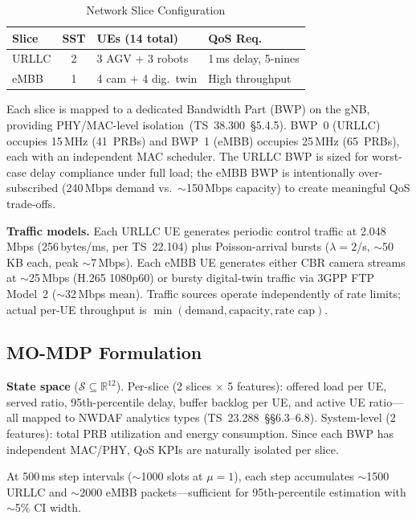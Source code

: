 \documentclass[conference]{IEEEtran}
\newcommand{\Real}{\mathbb{R}}
\begin{document}
\begin{table}[t]
\centering
\caption{Network Slice Configuration}
\label{tab:slices}
\footnotesize
\setlength{\tabcolsep}{2.5pt}
\begin{tabular}{@{}lclp{1.9cm}@{}}
\toprule
\textbf{Slice} & \textbf{SST} & \textbf{UEs (14 total)} & \textbf{QoS Req.} \\
\midrule
URLLC & 2 & 3 AGV + 3 robots & 1\,ms delay, 5-nines \\
eMBB & 1 & 4 cam + 4 dig.\ twin & High throughput \\
\bottomrule
\end{tabular}
\end{table}

Each slice is mapped to a dedicated Bandwidth Part (BWP) on the gNB, providing PHY/MAC-level isolation~(TS~38.300~\S5.4.5).
BWP~0 (URLLC) occupies 15\,MHz (41~PRBs) and BWP~1 (eMBB) occupies 25\,MHz (65~PRBs), each with an independent MAC scheduler.
The URLLC BWP is sized for worst-case delay compliance under full load; the eMBB BWP is intentionally over-subscribed (240\,Mbps demand vs.\ $\sim$150\,Mbps capacity) to create meaningful QoS trade-offs.

\textbf{Traffic models.}
Each URLLC UE generates periodic control traffic at 2.048\,Mbps (256\,bytes/ms, per TS~22.104) plus Poisson-arrival bursts ($\lambda{=}2$/s, $\sim$50\,KB each, peak $\sim$7\,Mbps).
Each eMBB UE generates either CBR camera streams at $\sim$25\,Mbps (H.265 1080p60) or bursty digital-twin traffic via 3GPP FTP Model~2 ($\sim$32\,Mbps mean).
Traffic sources operate independently of rate limits; actual per-UE throughput is $\min(\text{demand}, \text{capacity}, \text{rate cap})$.

\subsection{MO-MDP Formulation}\label{sec:mdp}

\textbf{State space} ($\mathcal{S} \subseteq \Real^{12}$).
Per-slice (2 slices $\times$ 5 features): offered load per UE, served ratio, 95th-percentile delay, buffer backlog per UE, and active UE ratio---all mapped to NWDAF analytics types (TS~23.288~\S\S6.3--6.8).
System-level (2 features): total PRB utilization and energy consumption.
Since each BWP has independent MAC/PHY, QoS KPIs are naturally isolated per slice.

At 500\,ms step intervals ($\sim$1000 slots at $\mu{=}1$), each step accumulates $\sim$1500 URLLC and $\sim$2000 eMBB packets---sufficient for 95th-percentile estimation with $\sim$5\% CI width.
\end{document}

